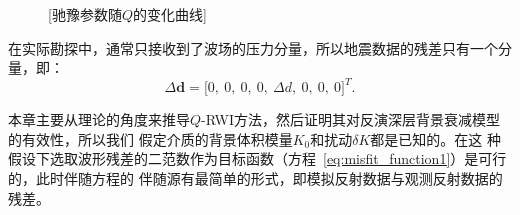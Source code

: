 \begin{figure}[!htbp]
    \centering
	[驰豫参数随$Q$的变化曲线]
    \label{fig:tq}
\end{figure}
在实际勘探中，通常只接收到了波场的压力分量，所以地震数据的残差只有一个分量，即：
\begin{equation}
    \Delta\mathbf{d} = \lbrack 0, \ 0, \ 0, \ 0, \ \Delta d, \ 0, \ 0, \ 0\rbrack^T.
\end{equation}

本章主要从理论的角度来推导$Q$-RWI方法，然后证明其对反演深层背景衰减模型的有效性，所以我们
假定介质的背景体积模量$K_0$和扰动$\delta K$都是已知的。在这
种假设下选取波形残差的二范数作为目标函数（方程~\ref{eq:misfit_function1}）是可行的，此时伴随方程的
伴随源有最简单的形式，即模拟反射数据与观测反射数据的残差。

